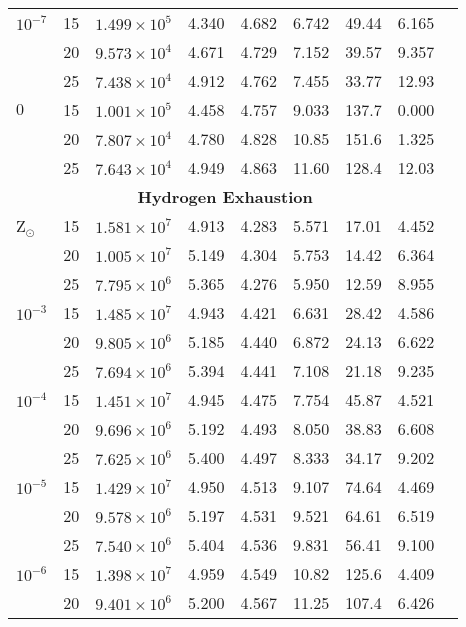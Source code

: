 \begin{table}[h!]
{\begin{tabular}{lcccccccc}
        $10^{-7}$ & 15 & $1.499 \times 10^5$  & 4.340 & 4.682 & 6.742 & 49.44  & 6.165  \\
                  & 20 & $9.573 \times 10^4$  & 4.671 & 4.729 & 7.152 & 39.57  & 9.357  \\
                  & 25 & $7.438 \times 10^4$  & 4.912 & 4.762 & 7.455 & 33.77  & 12.93  \\
        $0$ & 15 & $1.001 \times 10^5$ & 4.458 & 4.757 & 9.033 & 137.7 & 0.000 \\
            & 20 & $7.807 \times 10^4$ & 4.780 & 4.828 & 10.85 & 151.6 & 1.325 \\
            & 25 & $7.643 \times 10^4$ & 4.949 & 4.863 & 11.60 & 128.4 & 12.03 \\
        \midrule
        \multicolumn{8}{c}{\textbf{ Hydrogen Exhaustion }} \\
        \midrule
        Z$_\odot$ & 15 & $1.581 \times 10^7$  & 4.913 & 4.283 & 5.571 & 17.01 & 4.452  \\
          & 20 & $1.005 \times 10^7$  & 5.149 & 4.304 & 5.753 & 14.42 & 6.364  \\
          & 25 & $7.795 \times 10^6$  & 5.365 & 4.276 & 5.950 & 12.59 & 8.955  \\
	$10^{-3}$ & 15 & $1.485 \times 10^7$  & 4.943 & 4.421 & 6.631 & 28.42 & 4.586  \\
          & 20 & $9.805 \times 10^6$  & 5.185 & 4.440 & 6.872 & 24.13 & 6.622  \\
          & 25 & $7.694 \times 10^6$  & 5.394 & 4.441 & 7.108 & 21.18 & 9.235  \\
	$10^{-4}$ & 15 & $1.451 \times 10^7$  & 4.945 & 4.475 & 7.754 & 45.87 & 4.521  \\
          & 20 & $9.696 \times 10^6$  & 5.192 & 4.493 & 8.050 & 38.83 & 6.608  \\
          & 25 & $7.625 \times 10^6$  & 5.400 & 4.497 & 8.333 & 34.17 & 9.202  \\
	$10^{-5}$ & 15 & $1.429 \times 10^7$  & 4.950 & 4.513 & 9.107 & 74.64 & 4.469  \\
          & 20 & $9.578 \times 10^6$  & 5.197 & 4.531 & 9.521 & 64.61 & 6.519  \\
          & 25 & $7.540 \times 10^6$  & 5.404 & 4.536 & 9.831 & 56.41 & 9.100  \\
	$10^{-6}$ & 15 & $1.398 \times 10^7$  & 4.959 & 4.549 & 10.82 & 125.6 & 4.409  \\
          & 20 & $9.401 \times 10^6$  & 5.200 & 4.567 & 11.25 & 107.4 & 6.426  \\

\end{tabular}}
\end{table}

